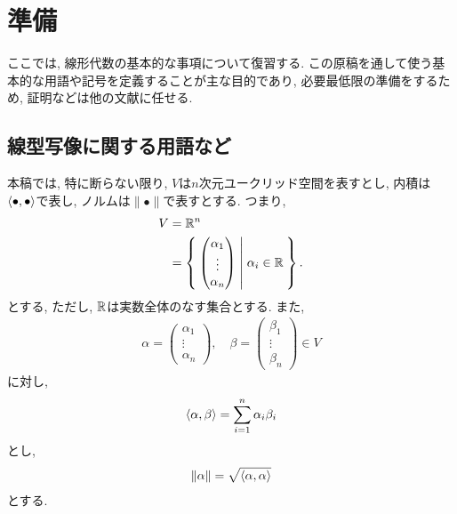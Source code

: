 \chapter{準備}
ここでは, 線形代数の基本的な事項について復習する.
この原稿を通して使う基本的な用語や記号を定義することが主な目的であり,
必要最低限の準備をするため, 証明などは他の文献に任せる.
\section{線型写像に関する用語など}
本稿では,
特に断らない限り,
$V$は$n$次元ユークリッド空間を表すとし,
内積は $\Braket{\bullet,\bullet}$で表し,
ノルムは$\|\bullet \|$で表すとする.
つまり,
\begin{align*}
  V&=\mathbb{R}^n\\
  &=\Set{\begin{pmatrix}\alpha_1\\\vdots\\\alpha_n\end{pmatrix} | \alpha_i \in \mathbb{R}}.
\end{align*}
とする, ただし, $\mathbb{R}$は実数全体のなす集合とする.
また, 
\begin{align*}
  \alpha=\begin{pmatrix}\alpha_1\\\vdots\\\alpha_n\end{pmatrix},\quad
  \beta=\begin{pmatrix}\beta_1\\\vdots\\\beta_n\end{pmatrix}\in V
\end{align*}
に対し,
\begin{align*}
\Braket{\alpha,\beta}=\sum_{i=1}^n \alpha_i \beta_i
\end{align*}
とし,
\begin{align*}
  \|\alpha \|=\sqrt{\Braket{\alpha,\alpha}}
\end{align*}
とする.

